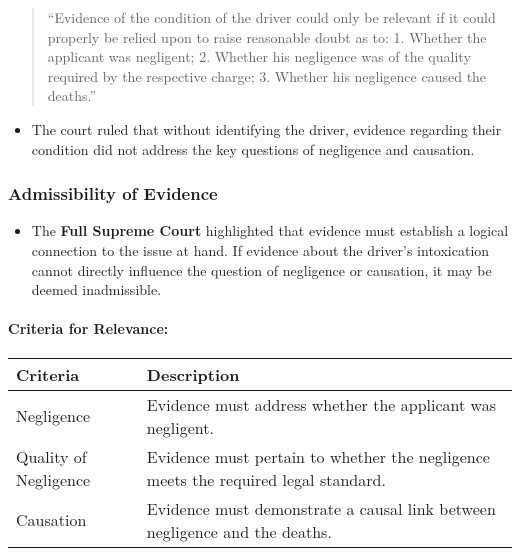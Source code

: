 \begin{quote}
``Evidence of the condition of the driver could only be relevant if it
could properly be relied upon to raise reasonable doubt as to: 1.
Whether the applicant was negligent; 2. Whether his negligence was of
the quality required by the respective charge; 3. Whether his negligence
caused the deaths.''
\end{quote}

\begin{itemize}
\tightlist
\item
  The court ruled that without identifying the driver, evidence
  regarding their condition did not address the key questions of
  negligence and causation.
\end{itemize}

\subsubsection{Admissibility of
Evidence}\label{admissibility-of-evidence-2}

\begin{itemize}
\tightlist
\item
  The \textbf{Full Supreme Court} highlighted that evidence must
  establish a logical connection to the issue at hand. If evidence about
  the driver's intoxication cannot directly influence the question of
  negligence or causation, it may be deemed inadmissible.
\end{itemize}

\paragraph{Criteria for Relevance:}\label{criteria-for-relevance}

\begin{longtable}[]{@{}
  >{\raggedright\arraybackslash}p{}
  >{\raggedright\arraybackslash}p{}@{}}
\toprule\noalign{}
\begin{minipage}[b]{\linewidth}\raggedright
Criteria
\end{minipage} & \begin{minipage}[b]{\linewidth}\raggedright
Description
\end{minipage} \\
\midrule\noalign{}
\endhead
\bottomrule\noalign{}
\endlastfoot
Negligence & Evidence must address whether the applicant was
negligent. \\
Quality of Negligence & Evidence must pertain to whether the negligence
meets the required legal standard. \\
Causation & Evidence must demonstrate a causal link between negligence
and the deaths. \\
\end{longtable}

